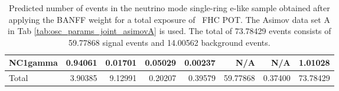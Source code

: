 \begin{table}
\begin{tabular} { | l ||r | r | r | r | r | r | | r | }
	 NC1gamma     & 0.94061              & 0.01701              & 0.05029              & 0.00237              & N/A                  & N/A                  & 1.01028              \\ \hline
	\hline
	 Total        & 3.90385              & 9.12991              & 0.20207              & 0.39579              & 59.77868             & 0.37400              & 73.78429             \\ \hline
	\end{tabular}
	\caption{Predicted number of events in the neutrino mode single-ring e-like sample obtained after applying the BANFF weight for a total exposure of \TotalPotNuRunOneNineC\ FHC POT. The Asimov data set A in Tab \ref{tab:osc_params_joint_asimovA} is used. The total of 73.78429 events consists of 59.77868 signal events and 14.00562 background events.}
	\label{tab:event_rates_exp_1Re}
\end{table}






